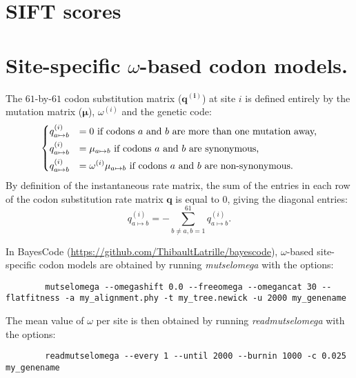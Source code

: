 \documentclass{article}
\newcommand{\UniDimArray}[1]{\bm{#1}}
\begin{document}
    \section{SIFT scores}
    


    \section{Site-specific $\omega$-based codon models.}
    The $61$-by-$61$ codon substitution matrix ($\UniDimArray{q^{(i)}}$) at site $i$ is defined entirely by the mutation matrix ($\UniDimArray{\mu}$), $\omega^{(i)}$ and the genetic code:
    \begin{equation}
        \begin{dcases}
            q_{a \mapsto b}^{(i)} & = 0 \text{ if codons $a$ and $b$ are more than one mutation away,} \\
            q_{a \mapsto b}^{(i)} & = \mu_{a \mapsto b} \text{ if codons $a$ and $b$ are synonymous,} \\
            q_{a \mapsto b}^{(i)} & = \omega^{(i)} \mu_{a \mapsto b} \text{ if codons $a$ and $b$ are non-synonymous}.
        \end{dcases}
    \end{equation}
    By definition of the instantaneous rate matrix, the sum of the entries in each row of the codon substitution rate matrix $\UniDimArray{q}$ is equal to $0$, giving the diagonal entries:
    \begin{equation}
        q_{a \mapsto b}^{(i)}= - \sum\limits_{b \neq a, b = 1}^{61} q_{a \mapsto b}^{(i)}.
    \end{equation}

    In BayesCode (\url{https://github.com/ThibaultLatrille/bayescode}), $\omega$-based site-specific codon models are obtained by running \textit{mutselomega} with the options:
    \begin{scriptsize}
        \begin{verbatim}
        mutselomega --omegashift 0.0 --freeomega --omegancat 30 --flatfitness -a my_alignment.phy -t my_tree.newick -u 2000 my_genename
        \end{verbatim}
    \end{scriptsize}
    The mean value of $\omega$ per site is then obtained by running \textit{readmutselomega} with the options:
    \begin{scriptsize}
        \begin{verbatim}
        readmutselomega --every 1 --until 2000 --burnin 1000 -c 0.025 my_genename
        \end{verbatim}
    \end{scriptsize}

    
\end{document}
